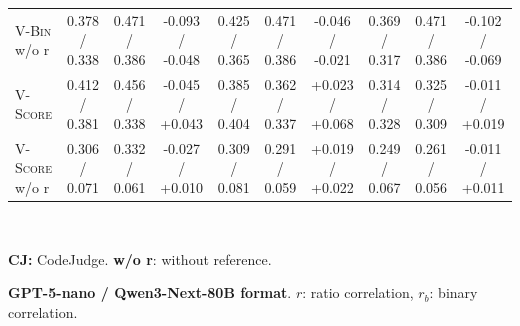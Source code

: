 \begin{table}[t]
\begin{tabular}{@{}
        l|ccc|ccc|ccc@{}}
        \textsc{V-Bin} w/o r    & 0.378 / 0.338   & 0.471 / 0.386   & -0.093 / -0.048                     & 0.425 / 0.365   & 0.471 / 0.386   & -0.046 / -0.021                     & 0.369 / 0.317   & 0.471 / 0.386   & -0.102 / -0.069                     \\
        \textsc{V-Score}        & 0.412 / 0.381   & 0.456 / 0.338   & -0.045 / +0.043                     & 0.385 / 0.404   & 0.362 / 0.337   & +0.023 / +0.068                     & 0.314 / 0.328   & 0.325 / 0.309   & -0.011 / +0.019                     \\
        \textsc{V-Score} w/o r  & 0.306 / 0.071   & 0.332 / 0.061   & -0.027 / +0.010                     & 0.309 / 0.081   & 0.291 / 0.059   & +0.019 / +0.022                     & 0.249 / 0.067   & 0.261 / 0.056   & -0.011 / +0.011                     \\
        \bottomrule
    \end{tabular}\\
    \begin{description}[itemsep=-3pt,topsep=0pt]
        \item \textbf{CJ:} CodeJudge. \hspace{10pt} \textbf{w/o r}: without reference.
        \item \textbf{GPT-5-nano / Qwen3-Next-80B format}. $r$: ratio correlation, $r_b$: binary correlation.
    \end{description}
\end{table}